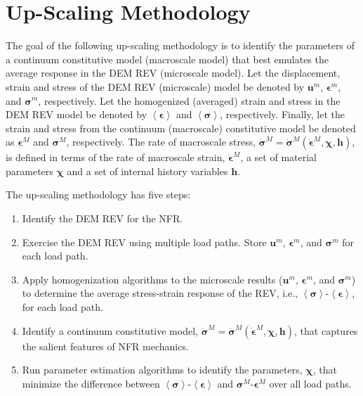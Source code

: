\chapter{Up-Scaling Methodology}

The goal of the following up-scaling methodology is to identify the parameters of a continuum constitutive model (macroscale model) that best emulates the average response in the DEM REV (microscale model). Let the displacement, strain and stress of the DEM REV (microscale) model be denoted by $\mathbf{u}^m$, $\boldsymbol{\epsilon}^m$, and $\boldsymbol{\sigma}^m$, respectively. Let the homogenized (averaged) strain and stress in the DEM REV model be denoted by  $\left<\boldsymbol{\epsilon}\right>$ and $\left<\boldsymbol{\sigma}\right>$, respectively.  Finally, let the strain and stress from the continuum (macroscale) constitutive model be denoted as $\boldsymbol{\epsilon}^M$ and $\boldsymbol{\sigma}^M$, respectively. The rate of macroscale stress, $\dot{\boldsymbol{\sigma}}^M=\dot{\boldsymbol{\sigma}}^M\left(\dot{\boldsymbol{\epsilon}}^M, \boldsymbol{\chi},\mathbf{h}\right)$, is defined in terms of the rate of macroscale strain, $\dot{\boldsymbol{\epsilon}}^M$, a set of material parameters $\boldsymbol{\chi}$ and a set of internal history variables $\mathbf{h}$.

The up-scaling methodology has five steps: 
\begin{enumerate}
    \item Identify the DEM REV for the NFR.
	\item Exercise the DEM REV using multiple load paths. Store $\mathbf{u}^m$, $\boldsymbol{\epsilon}^m$, and $\boldsymbol{\sigma}^m$ for each load path.
	\item Apply homogenization algorithms to the microscale results ($\mathbf{u}^m$, $\boldsymbol{\epsilon}^m$, and $\boldsymbol{\sigma}^m$) to determine the average stress-strain response of the REV, i.e., $\left<\boldsymbol{\sigma}\right>$-$\left<\boldsymbol{\epsilon}\right>$, for each load path.
	\item Identify a continuum constitutive model, $\dot{\boldsymbol{\sigma}}^M=\dot{\boldsymbol{\sigma}}^M\left(\dot{\boldsymbol{\epsilon}}^M, \boldsymbol{\chi},\mathbf{h}\right)$, that captures the salient features of NFR mechanics.
	\item Run parameter estimation algorithms to identify the parameters, $\boldsymbol{\chi}$, that minimize the difference between $\left<\boldsymbol{\sigma}\right>$-$\left<\boldsymbol{\epsilon}\right>$ and $\boldsymbol{\sigma}^M$-$\boldsymbol{\epsilon}^M$ over all load paths.
\end{enumerate}

